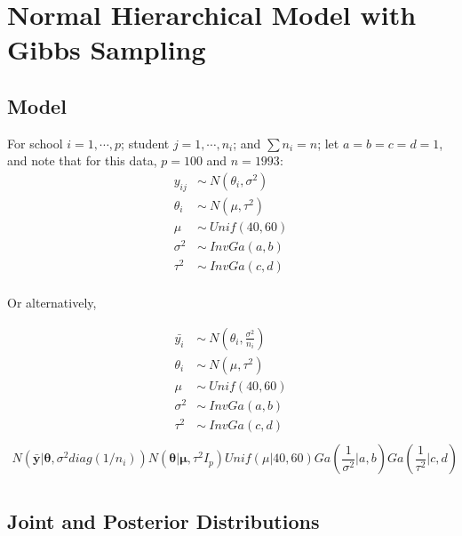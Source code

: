 \documentclass[12pt,letterpaper]{article}\usepackage[]{graphicx}\usepackage[]{color}
\begin{document}
\section{Normal Hierarchical Model with Gibbs Sampling}

\subsection{Model}
For school $i=1,\cdots,p$; student $j=1,\cdots,n_i$; and $\sum n_i = n$; 
let $a=b=c=d=1$, and note that for this data, $p=100$ and $n=1993$:
\begin{align*}
  y_{ij} &\sim\ N(\theta_i,\sigma^2)\\
  \theta_i &\sim\ N(\mu,\tau^2)\\
  \mu &\sim\ Unif(40, 60)\\
  \sigma^2 &\sim\ InvGa(a,b)\\
  \tau^2 &\sim\ InvGa(c,d)\\
\end{align*}

Or alternatively,

\begin{align*}
  \bar{y_i} &\sim\ N(\theta_i,\frac{\sigma^2}{n_i})\\
  \theta_i &\sim\ N(\mu,\tau^2)\\
  \mu &\sim\ Unif(40, 60)\\
  \sigma^2 &\sim\ InvGa(a,b)\\
  \tau^2 &\sim\ InvGa(c,d)\\
\end{align*}
\begin{align*}
  N(\pmb{\bar{y}}|\pmb{\theta},\sigma^2 diag(1/n_i))
    N(\pmb{\theta}|\pmb{\mu}, \tau^2 I_p)
    Unif(\mu|40,60)
		Ga(\dfrac{1}{\sigma^2}|a, b) Ga(\dfrac{1}{\tau^2}|c, d)\\
\end{align*}


\subsection{Joint and Posterior Distributions}
\end{document}
